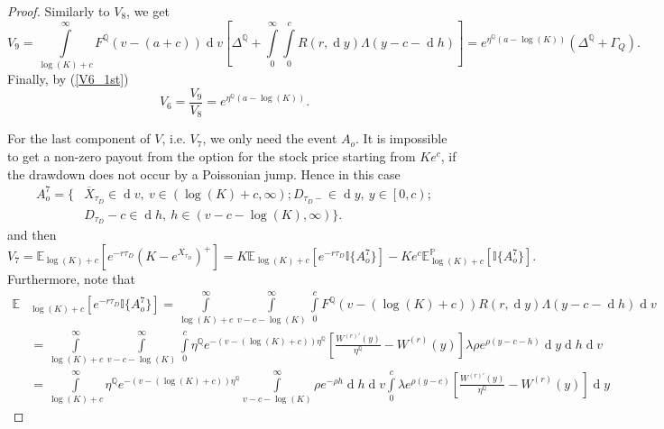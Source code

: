\documentclass[10pt,a4paper]{amsart}
\def\E{{\mathbb{E}}}
\def\P{{\mathbb{P}}}
\def\Q{{\mathbb{Q}}}
\def \R{{{\rm I{\!}\rm R}}}
\def \I{{\mathbb{I}}}
\newcommand{\dx}{\operatorname{d}\!}
\def\P{{\mathbb P}} \def\le{\left} \def\ri{\right} \def\i{\infty}
\def\E{{\mathbb E}} \def\PP{\mc P} \def\Z{{\mathbb Z}} \def\R{{\mathbb R}}
\begin{document}
\begin{proof}
			Similarly to $V_8$, we get
			\begin{equation*}
				V_9 = \int\limits_{\log(K)+c}^{\infty}F^\Q(v-(a+c))\dx v \left[ \Delta^\Q + \int\limits_{0}^{\infty}\int\limits_{0}^{c} R(r,\dx y) 	\Lambda(y-c-\dx h)  \right] = e^{\eta^\Q(a-\log(K))}(\Delta^\Q + \Gamma_Q).
			\end{equation*}	
			Finally, by (\ref{V6_1st})
			\begin{equation}
				V_6 = \frac{V_9}{V_8} = e^{\eta^\Q(a-\log(K))}.\label{V6}
			\end{equation}
			
			For the last component of $V$, i.e. $V_7$, we only need the event $A_o$. It is impossible to get a non-zero payout from the option for the stock price starting from $Ke^c$, if the drawdown does not occur by a Poissonian jump. Hence in this case
			\begin{align}\label{A7}
				A_o^7 = \{& \overline{X}_{\tau_D} \in \dx v,\ v \in (\log(K)+c, \infty); D_{\tau_D-} \in \dx y,\ y \in \left[ 0,c \right); \\ \nonumber & D_{\tau_D} - c \in \dx h,\ h \in (v-c-\log(K), \infty)
				\}.
			\end{align}
			and then
			\begin{equation*}
				V_7 = \E_{\log(K)+c}\left[ e^{-r\tau_D} \left( K - e^{X_{\tau_D}} \right)^+ \right] = K \E_{\log(K)+c}\left[ e^{-r\tau_D} \I \{ A_o^7 \} \right] - Ke^c \E^\P_{\log(K)+c}\left[ \I \{ A_o^7 \} \right].
			\end{equation*}
			Furthermore, note that		
			\begin{align*}
				\E&_{\log(K)+c}\left[ e^{-r\tau_D} \I \{ A_o^7 \} \right] = \int\limits_{\log(K)+c}^{\infty} \int\limits_{v-c-\log(K)}^{\infty}\int\limits_{0}^{c}F^\Q(v-(\log(K)+c))   R(r,\dx y) 	\Lambda(y-c-\dx h)   \dx v
				\\
				\nonumber&= \int\limits_{\log(K)+c}^{\infty} \int\limits_{v-c-\log(K)}^{\infty}\int\limits_{0}^{c} \eta^\Q e^{-( v - (\log(K)+c) )\eta^\Q} \left[ \frac{W^{(r)'}(y)}{\eta^{\Q}} - W^{(r)}(y) \right] \lambda\rho e^{\rho(y-c-h)} \dx y \dx h \dx v
				\\
				\nonumber&=  \int\limits_{\log(K)+c}^{\infty} \eta^\Q  e^{-( v - (\log(K)+c) )\eta^\Q} \int\limits_{v-c-\log(K)}^{\infty} \rho e^{ - \rho h} \dx h \dx v \int\limits_{0}^{c} \lambda e^{\rho(y-c)} \left[ \frac{W^{(r)'}(y)}{\eta^{\Q}} - W^{(r)}(y) \right] \dx y

\end{align*}
\end{proof}
\end{document}
